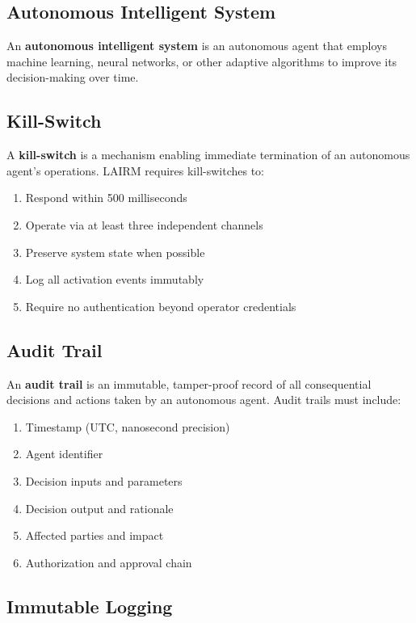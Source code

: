 \documentclass[12pt,a4paper,twoside,openright]{book}
\begin{document}
\subsection{Autonomous Intelligent System}

An \textbf{autonomous intelligent system} is an autonomous agent that employs machine learning, neural networks, or other adaptive algorithms to improve its decision-making over time.

\subsection{Kill-Switch}

A \textbf{kill-switch} is a mechanism enabling immediate termination of an autonomous agent's operations. LAIRM requires kill-switches to:
\begin{enumerate}
    \item Respond within 500 milliseconds
    \item Operate via at least three independent channels
    \item Preserve system state when possible
    \item Log all activation events immutably
    \item Require no authentication beyond operator credentials
\end{enumerate}

\subsection{Audit Trail}

An \textbf{audit trail} is an immutable, tamper-proof record of all consequential decisions and actions taken by an autonomous agent. Audit trails must include:
\begin{enumerate}
    \item Timestamp (UTC, nanosecond precision)
    \item Agent identifier
    \item Decision inputs and parameters
    \item Decision output and rationale
    \item Affected parties and impact
    \item Authorization and approval chain
\end{enumerate}

\subsection{Immutable Logging}
\end{document}
